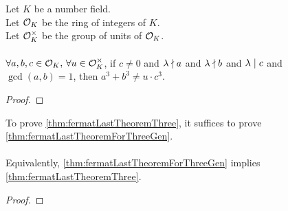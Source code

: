 \begin{theorem}
    \label{thm:fermatLastTheoremForThreeGen}
    \leanok
    Let $K$ be a number field. \\
    Let $\mathcal{O}_K$ be the ring of integers of $K$. \\
    Let $\mathcal{O}^\times_K$ be the group of units of $\mathcal{O}_K$. \\ \\
    $\forall a, b, c \in \mathcal{O}_K,\, \forall u \in \mathcal{O}^\times_K$, if $c \neq 0$
    and $\lambda \nmid a$ and $\lambda \nmid b$ and
    $\lambda \mid c$ and $\gcd(a,b)=1$, then $a^3 + b^3 \neq u \cdot c^3$.
\end{theorem}
\begin{proof}
    \leanok
    \uses{

    }
\end{proof}

\begin{lemma}
    \label{lmm:FermatLastTheoremForThree_of_FermatLastTheoremThreeGen}
    \leanok
    To prove \ref{thm:fermatLastTheoremThree},
    it suffices to prove \ref{thm:fermatLastTheoremForThreeGen}. \\\\
    Equivalently, \ref{thm:fermatLastTheoremForThreeGen} implies \ref{thm:fermatLastTheoremThree}.
\end{lemma}
\begin{proof}
    \leanok
\end{proof}